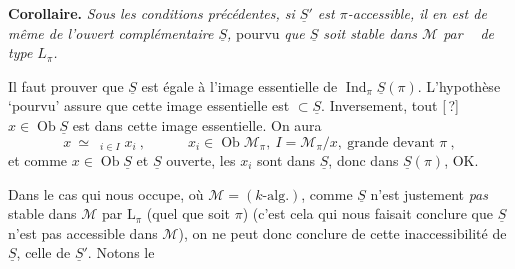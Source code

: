 \documentclass[11pt]{article}
\newcommand{\msp}[1]{\marginpar{\footnotesize [#1]}}
\newcommand{\limind}{\mathop{\underrightarrow{\mathrm{lim}}}}
\begin{document}
\textbf{Corollaire.} \textit{Sous les conditions précédentes, si $\underline{S}'$ est $\pi$-accessible, il en est de même de l'ouvert complémentaire $\underline{S}$,} pourvu \textit{que $\underline{S}$ soit stable dans $\mathcal{M}$ par $\limind$ de type $L_\pi$.}

Il faut prouver que $\underline{S}$ est égale à l'image essentielle de $\operatorname{Ind}_\pi\underline{S}(\pi)$. L'hypothèse `pourvu' assure que cette image essentielle est $\subset\underline{S}$. Inversement, tout [\,?] $x\in\operatorname{Ob}\underline{S}$ est dans cette image essentielle. On aura
\[
x\ \simeq\ \limind_{i\in I}x_i\ ,\qquad\quad x_i\in\operatorname{Ob}\mathcal{M}_\pi,\ I=\mathcal{M}_\pi/x,\ \text{grande devant } \pi\ ,
\]
et comme $x\in\operatorname{Ob}\underline{S}$ et $\underline{S}$ ouverte, les $x_i$ sont dans $\underline{S}$, donc dans $\underline{S}(\pi)$, OK.

Dans le cas qui nous occupe, où $\mathcal{M}=(k\text{-alg.})$, comme $\underline{S}$ n'est justement \textit{pas} stable dans $\mathcal{M}$ par $\mathrm{L}_\pi$ (quel que soit $\pi$) (c'est cela qui nous faisait conclure que
\msp{page 19}
$\underline{S}$ n'est pas accessible dans $\mathcal{M}$), on ne peut donc conclure de cette inaccessibilité de $\underline{S}$, celle de $\underline{S}'$. Notons le
\end{document}
